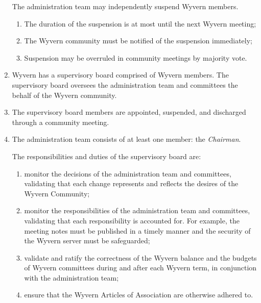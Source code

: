 \begin{enumerate}
    \begin{item}
        The administration team may independently suspend Wyvern members.
        \begin{enumerate}
            \item The duration of the suspension is at most until the next Wyvern meeting;
            \item The Wyvern community must be notified of the suspension immediately;
            \item Suspension may be overruled in community meetings by majority vote.
       \end{enumerate}
    \end{item}

    \item Wyvern has a supervisory board comprised of Wyvern members. The supervisory board oversees the administration team and committees the behalf of the Wyvern community.
    
    \item The supervisory board members are appointed, suspended, and discharged through a community meeting.
    
    \item The administration team consists of at least one member: the \emph{Chairman}.
    
    \begin{item}
        The responsibilities and duties of the supervisory board are:
        \begin{enumerate}
            \item monitor the decisions of the administration team and committees, validating that each change represents and reflects the desires of the Wyvern Community;
            \item monitor the responsibilities of the administration team and committees, validating that each responsibility is accounted for. For example, the meeting notes must be published in a timely manner and the security of the Wyvern server must be safeguarded;
            \item validate and ratify the correctness of the Wyvern balance and the budgets of Wyvern committees during and after each Wyvern term, in conjunction with the administration team;
            \item ensure that the Wyvern Articles of Association are otherwise adhered to.
        \end{enumerate}
    \end{item}


\end{enumerate}
